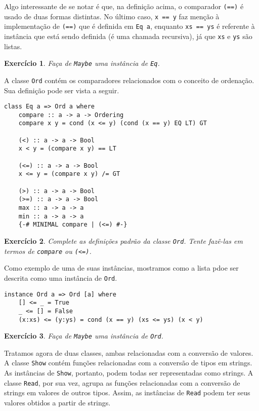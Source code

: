 \documentclass[a4paper]{article}
\newtheorem{exercicio}{Exercício}
\begin{document}
Algo interessante de se notar é que, na definição acima, o comparador \texttt{(==)} é usado de duas formas distintas.
No último caso, \texttt{x == y} faz menção à implementação de \texttt{(==)} que é definida em \texttt{Eq a}, enquanto \texttt{xs == ys} é referente à instância que está sendo definida (é uma chamada recursiva), já que \texttt{xs} e \texttt{ys} são listas.

\begin{exercicio}
	Faça de \emph{\texttt{Maybe}} uma instância de \emph{\texttt{Eq}}.
\end{exercicio}

A classe \texttt{Ord} contém os comparadores relacionados com o conceito de ordenação.
Sua definição pode ser vista a seguir.

\begin{verbatim}
class Eq a => Ord a where
	compare :: a -> a -> Ordering
	compare x y = cond (x <= y) (cond (x == y) EQ LT) GT
	
	(<) :: a -> a -> Bool
	x < y = (compare x y) == LT
	
	(<=) :: a -> a -> Bool
	x <= y = (compare x y) /= GT
	
	(>) :: a -> a -> Bool
	(>=) :: a -> a -> Bool
	max :: a -> a -> a
	min :: a -> a -> a
	{-# MINIMAL compare | (<=) #-}
\end{verbatim}

\begin{exercicio}
	Complete as definições padrão da classe \emph{\texttt{Ord}}.
	Tente fazê-las em termos de \emph{\texttt{compare}} ou \emph{\texttt{(<=)}}.
\end{exercicio}

Como exemplo de uma de suas instâncias, mostramos como a lista pdoe ser descrita como uma instância de \texttt{Ord}.

\begin{verbatim}
instance Ord a => Ord [a] where
	[] <= _ = True
	_ <= [] = False
	(x:xs) <= (y:ys) = cond (x == y) (xs <= ys) (x < y)
\end{verbatim}

\begin{exercicio}
	Faça de \emph{\texttt{Maybe}} uma instância de \emph{\texttt{Ord}}.
\end{exercicio}

Tratamos agora de duas classes, ambas relacionadas com a conversão de valores.
A classe \texttt{Show} contém funções relacionadas com a conversão de tipos em strings.
As instâncias de \texttt{Show}, portanto, podem todas ser representadas como strings.
A classe \texttt{Read}, por sua vez, agrupa as funções relacionadas com a conversão de strings em valores de outros tipos.
Assim, as instâncias de \texttt{Read} podem ter seus valores obtidos a partir de strings.
\end{document}
